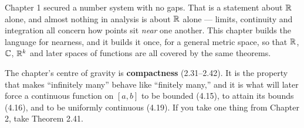 
\begin{roadmap}
Chapter 1 secured a number system with no gaps. That is a statement about
$\mathbb{R}$ alone, and almost nothing in analysis is about $\mathbb{R}$ alone --- limits,
continuity and integration all concern how points sit \emph{near} one another.
This chapter builds the language for nearness, and it builds it once, for a
general metric space, so that $\mathbb{R}$, $\mathbb{C}$, $\mathbb{R}^k$ and later spaces of functions
are all covered by the same theorems.

\medskip
The chapter's centre of gravity is \textbf{compactness} (2.31--2.42). It is the
property that makes ``infinitely many'' behave like ``finitely many,'' and it
is what will later force a continuous function on $[a,b]$ to be bounded (4.15),
to attain its bounds (4.16), and to be uniformly continuous (4.19). If you take
one thing from Chapter 2, take Theorem 2.41.
\end{roadmap}

